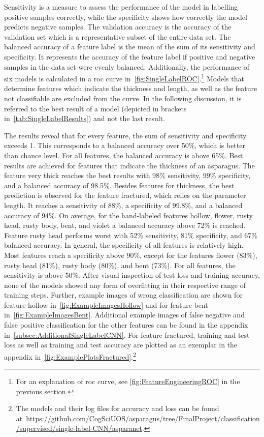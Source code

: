 Sensitivity is a measure to assess the performance of the model in labelling positive samples correctly, while the specificity shows how correctly the model predicts negative samples. The validation accuracy is the accuracy of the validation set which is a representative subset of the entire data set. The balanced accuracy of a feature label is the mean of the sum of its sensitivity and specificity. It represents the accuracy of the feature label if positive and negative samples in the data set were evenly balanced.
Additionally, the performance of six models is calculated in a \acrshort{roc} curve in~\autoref{fig:SingleLabelROC}.\footnote{For an explanation of \acrshort{roc} curve, see \autoref{fig:FeatureEngineeringROC} in the previous section.} Models that determine features which indicate the thickness and length, as well as the feature not classifiable are excluded from the curve.
In the following discussion, it is referred to the best result of a model (depicted in brackets in~\autoref{tab:SingleLabelResults}) and not the last result.

The results reveal that for every feature, the sum of sensitivity and specificity exceeds 1.  This corresponds to a balanced accuracy over 50\%, which is better than chance level. For all features, the balanced accuracy is above 65\%. Best results are achieved for features that indicate the thickness of an asparagus. The feature very thick reaches the best results with 98\% sensitivity, 99\% specificity, and a balanced accuracy of 98.5\%. Besides features for thickness, the best prediction is observed for the feature fractured, which relies on the parameter length. It reaches a sensitivity of 88\%, a specificity of 99.8\%, and a balanced accuracy of 94\%.
On average, for the hand-labeled features hollow, flower, rusty head, rusty body, bent, and violet a balanced accuracy above 72\% is reached. Feature rusty head performs worst with 52\% sensitivity, 81\% specificity, and 67\% balanced accuracy. In general, the specificity of all features is relatively high. Most features reach a specificity above 90\%, except for the features flower (83\%), rusty head (81\%), rusty body (80\%), and bent (73\%). For all features, the sensitivity is above 50\%. After visual inspection of test loss and training accuracy, none of the models showed any form of overfitting in their respective range of training steps.
Further, example images of wrong classification are shown for feature hollow in~\autoref{fig:ExampleImagesHollow} and for feature bent in~\autoref{fig:ExampleImagesBent}. Additional example images of false negative and false positive classification for the other features can be found in the appendix in~\autoref{subsec:AdditionalSingleLabelCNN}. For feature fractured, training and test loss as well as training and test accuracy are plotted as an exemplar in the appendix in~\autoref{fig:ExamplePlotsFractured}.\footnote{The models and their log files for accuracy and loss can be found at~\url{https://github.com/CogSciUOS/asparagus/tree/FinalProject/classification/supervised/single-label-CNN/asparanet}.}
 

